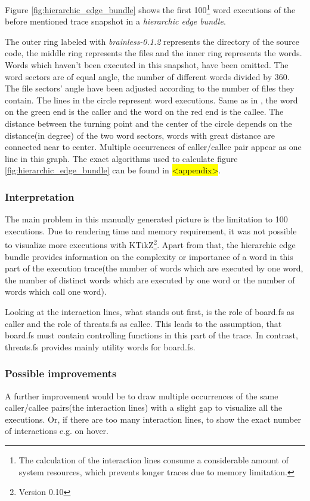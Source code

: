 Figure \ref{fig:hierarchic_edge_bundle} shows the first 100\footnote{The calculation of the interaction lines consume a considerable amount of system resources, which prevents longer traces due to memory limitation.} word executions of the before mentioned trace snapshot in a \emph{hierarchic edge bundle}.

The outer ring labeled with \emph{brainless-0.1.2} represents the directory of the source code, the middle ring represents the files and the inner ring represents the words. Words which haven't been executed in this snapshot, have been omitted.
The word sectors are of equal angle, the number of different words divided by 360\degree. The file sectors' angle have been adjusted according to the number of files they contain.
The lines in the circle represent word executions. Same as in \cite{Holten:2006:HEB:1187627.1187772}, the word on the green end is the caller and the word on the red end is the callee. The distance between the turning point and the center of the circle depends on the distance(in degree) of the two word sectors, words with great distance are connected near to center. Multiple occurrences of caller/callee pair appear as one line in this graph. The exact algorithms used to calculate figure \ref{fig:hierarchic_edge_bundle} can be found in \hl{<appendix>}.

\subsubsection*{Interpretation}
The main problem in this manually generated picture is the limitation to  100 executions. Due to rendering time and memory requirement, it was not possible to visualize more executions with KTikZ\footnote{Version 0.10}.
Apart from that, the hierarchic edge bundle provides information on the complexity or importance of a word in this part of the execution trace(the number of words which are executed by one word, the number of distinct words which are executed by one word or the number of words which call one word).

Looking at the interaction lines, what stands out first, is the role of board.fs as caller and the role of threats.fs as callee. This leads to the assumption, that board.fs must contain controlling functions in this part of the trace. In contrast, threats.fs provides mainly utility words for board.fs.

\subsubsection*{Possible improvements}
A further improvement would be to draw multiple occurrences of the same caller/callee pairs(the interaction lines) with a slight gap to visualize all the executions. Or, if there are too many interaction lines, to show the exact number of interactions e.g. on hover.

